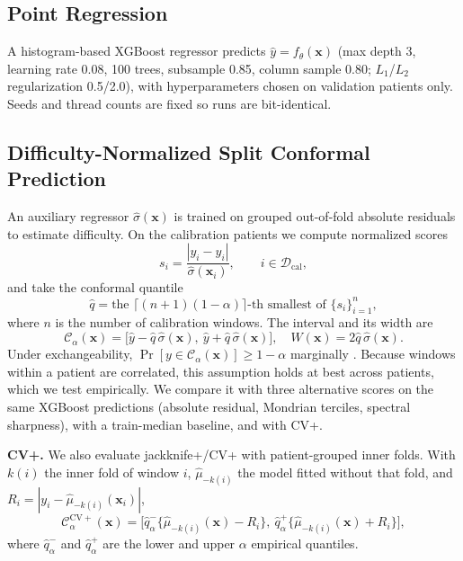 \documentclass[conference]{IEEEtran}
\newcommand{\Cset}{\mathcal{C}_{\alpha}}
\begin{document}
\subsection{Point Regression}
A histogram-based XGBoost regressor \cite{chen2016xgboost} predicts $\hat{y}=f_\theta(\mathbf{x})$ (max depth 3, learning rate 0.08, 100 trees, subsample 0.85, column sample 0.80; $L_1$/$L_2$ regularization 0.5/2.0), with hyperparameters chosen on validation patients only. Seeds and thread counts are fixed so runs are bit-identical.

\subsection{Difficulty-Normalized Split Conformal Prediction}
An auxiliary regressor $\hat{\sigma}(\mathbf{x})$ is trained on grouped out-of-fold absolute residuals to estimate difficulty. On the calibration patients we compute normalized scores
\begin{equation}
s_i=\frac{|y_i-\hat{y}_i|}{\hat{\sigma}(\mathbf{x}_i)},\qquad i\in\mathcal{D}_{\mathrm{cal}},\label{eq:score}
\end{equation}
and take the conformal quantile
\begin{equation}
\hat{q}=\text{the } \lceil (n+1)(1-\alpha)\rceil\text{-th smallest of } \{s_i\}_{i=1}^{n},\label{eq:qhat}
\end{equation}
where $n$ is the number of calibration windows. The interval and its width are
\begin{equation}
\Cset(\mathbf{x})=\big[\hat{y}-\hat{q}\,\hat{\sigma}(\mathbf{x}),\ \hat{y}+\hat{q}\,\hat{\sigma}(\mathbf{x})\big],\quad W(\mathbf{x})=2\hat{q}\,\hat{\sigma}(\mathbf{x}).\label{eq:interval}
\end{equation}
Under exchangeability, $\Pr[y\in\Cset(\mathbf{x})]\ge 1-\alpha$ marginally \cite{vovk2005,lei2018distfree}. Because windows within a patient are correlated, this assumption holds at best across patients, which we test empirically. We compare it with three alternative scores on the same XGBoost predictions (absolute residual, Mondrian terciles, spectral sharpness), with a train-median baseline, and with CV+.

\textbf{CV+.} We also evaluate jackknife+/CV+ \cite{barber2021jackknife} with patient-grouped inner folds. With $k(i)$ the inner fold of window $i$, $\hat{\mu}_{-k(i)}$ the model fitted without that fold, and $R_i=|y_i-\hat{\mu}_{-k(i)}(\mathbf{x}_i)|$,
\begin{equation}
\Cset^{\mathrm{CV+}}(\mathbf{x})=\Big[\hat{q}^{-}_{\alpha}\{\hat{\mu}_{-k(i)}(\mathbf{x})-R_i\},\ \hat{q}^{+}_{\alpha}\{\hat{\mu}_{-k(i)}(\mathbf{x})+R_i\}\Big],\label{eq:cvplus}
\end{equation}
where $\hat{q}^{-}_{\alpha}$ and $\hat{q}^{+}_{\alpha}$ are the lower and upper $\alpha$ empirical quantiles.
\end{document}
